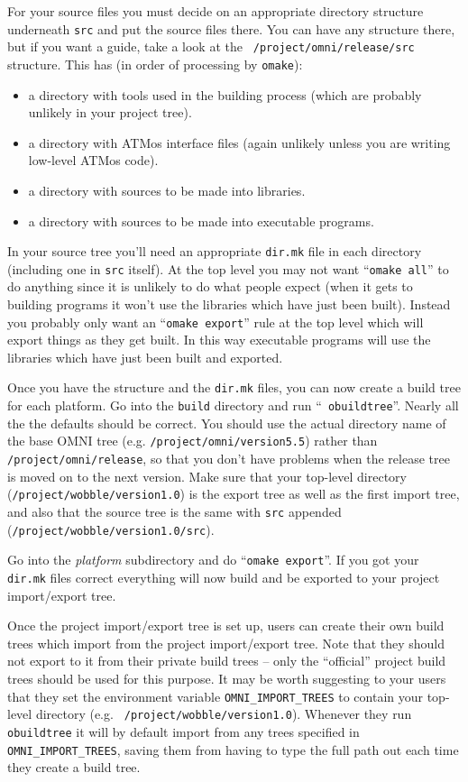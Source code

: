 \documentclass[11pt,twoside,onecolumn]{article}
\begin{document}
For your source files you must decide on an appropriate directory structure
underneath {\tt src} and put the source files there.  You can have any
structure there, but if you want a guide, take a look at the {\tt
/project/omni/release/src} structure.  This has (in order of processing by
{\tt omake}):
\begin{itemize}
\item a directory with tools used in the building process (which are probably
unlikely in your project tree).
\item a directory with ATMos interface files (again unlikely unless you are
writing low-level ATMos code).
\item a directory with sources to be made into libraries.
\item a directory with sources to be made into executable programs.
\end{itemize}
In your source tree you'll need an appropriate {\tt dir.mk} file in each
directory (including one in {\tt src} itself).  At the top level you may not
want ``{\tt omake all}'' to do anything since it is unlikely to do what people
expect (when it gets to building programs it won't use the libraries which have
just been built).  Instead you probably only want an ``{\tt omake export}''
rule at the top level which will export things as they get built.  In this way
executable programs will use the libraries which have just been built and
exported.

Once you have the structure and the {\tt dir.mk} files, you can now create a
build tree for each platform.  Go into the {\tt build} directory and run ``{\tt
obuildtree}''.  Nearly all the the defaults should be correct.  You should use
the actual directory name of the base OMNI tree
(e.g. \verb|/project/omni/version5.5|) rather than
\verb|/project/omni/release|, so that you don't have problems when the release
tree is moved on to the next version.  Make sure that your top-level directory
({\tt /project/wobble/version1.0}) is the export tree as well as the first
import tree, and also that the source tree is the same with {\tt src} appended
({\tt /project/wobble/version1.0/src}).

Go into the {\it platform} subdirectory and do ``{\tt omake export}''.  If you
got your {\tt dir.mk} files correct everything will now build and be exported
to your project import/export tree.

Once the project import/export tree is set up, users can create their own build
trees which import from the project import/export tree.  Note that they should
not export to it from their private build trees -- only the ``official''
project build trees should be used for this purpose.  It may be worth
suggesting to your users that they set the environment variable
\verb|OMNI_IMPORT_TREES| to contain your top-level directory (e.g. {\tt
/project/wobble/version1.0}).  Whenever they run {\tt obuildtree} it will by
default import from any trees specified in \verb|OMNI_IMPORT_TREES|, saving
them from having to type the full path out each time they create a build tree.
\end{document}
